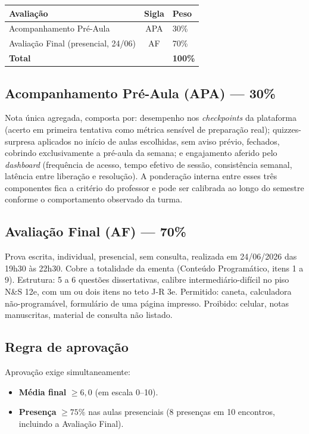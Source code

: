 \documentclass[11pt,a4paper]{article}
\newcommand{\ns}{N\&S 12e}
\newcommand{\jr}{J-R 3e}
\begin{document}
\begin{center}
\begin{tabular}{@{}lcl@{}}
\toprule
\textbf{Avaliação} & \textbf{Sigla} & \textbf{Peso} \\
\midrule
Acompanhamento Pré-Aula & APA & 30\% \\
Avaliação Final (presencial, 24/06) & AF & 70\% \\
\midrule
\textbf{Total} & & \textbf{100\%} \\
\bottomrule
\end{tabular}
\end{center}

\subsection*{Acompanhamento Pré-Aula (APA) --- 30\%}

Nota única agregada, composta por: desempenho nos \textit{checkpoints} da plataforma (acerto em primeira tentativa como métrica sensível de preparação real); quizzes-surpresa aplicados no início de aulas escolhidas, sem aviso prévio, fechados, cobrindo exclusivamente a pré-aula da semana; e engajamento aferido pelo \textit{dashboard} (frequência de acesso, tempo efetivo de sessão, consistência semanal, latência entre liberação e resolução). A ponderação interna entre esses três componentes fica a critério do professor e pode ser calibrada ao longo do semestre conforme o comportamento observado da turma.

\subsection*{Avaliação Final (AF) --- 70\%}

Prova escrita, individual, presencial, sem consulta, realizada em 24/06/2026 das 19h30 às 22h30. Cobre a totalidade da ementa (Conteúdo Programático, itens 1 a 9). Estrutura: 5 a 6 questões dissertativas, calibre intermediário-difícil no piso \ns{}, com um ou dois itens no teto \jr{}. Permitido: caneta, calculadora não-programável, formulário de uma página impresso. Proibido: celular, notas manuscritas, material de consulta não listado.

\subsection*{Regra de aprovação}

Aprovação exige simultaneamente:
\begin{itemize}
  \item \textbf{Média final} $\geq 6{,}0$ (em escala 0--10).
  \item \textbf{Presença} $\geq 75\%$ nas aulas presenciais (8 presenças em 10 encontros, incluindo a Avaliação Final).
\end{itemize}
\end{document}
